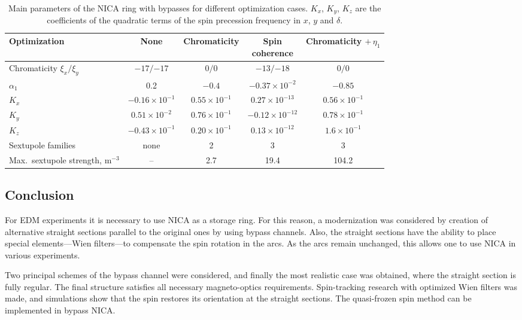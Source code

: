 \documentclass[%
  aps,
  pra,
  preprint,
  a4paper,
  amsmath,
  amssymb,
  floatfix,
  longbibliography,
  superscriptaddress
]{revtex4-2}
\begin{document}
\begin{table}[htbp]
  \centering
  \caption{Main parameters of the NICA ring with bypasses for different
    optimization cases. $K_x$, $K_y$, $K_z$ are the coefficients of the
    quadratic terms of the spin precession frequency in $x$, $y$ and $\delta$.}
  \label{tab:bypass_opt}
  \small
  \setlength{\tabcolsep}{3pt}
  \begin{tabular}{lcccc}
    \toprule
    Optimization & None & Chromaticity & \makecell{Spin\\coherence}
      & \makecell{Chromaticity\\$+\,\eta_1$} \\
    \midrule
    Chromaticity $\xi_x/\xi_y$ & $-17/{-17}$ & $0/0$ & $-13/{-18}$ & $0/0$ \\
    $\alpha_1$ & 0.2 & $-0.4$ & $-0.37\times10^{-2}$ & $-0.85$ \\
    $K_x$ & $-0.16\times10^{-1}$ & $0.55\times10^{-1}$ & $0.27\times10^{-13}$ & $0.56\times10^{-1}$ \\
    $K_y$ & $0.51\times10^{-2}$ & $0.76\times10^{-1}$ & $-0.12\times10^{-12}$ & $0.78\times10^{-1}$ \\
    $K_z$ & $-0.43\times10^{-1}$ & $0.20\times10^{-1}$ & $0.13\times10^{-12}$ & $1.6\times10^{-1}$ \\
    Sextupole families & none & 2 & 3 & 3 \\
    \makecell[l]{Max.\ sextupole\\strength, m$^{-3}$} & -- & 2.7 & 19.4 & 104.2 \\
    \bottomrule
  \end{tabular}
\end{table}

\subsection{Conclusion}

For EDM experiments it is necessary to use NICA as a storage ring. For this
reason, a modernization was considered by creation of alternative straight
sections parallel to the original ones by using bypass channels. Also, the
straight sections have the ability to place special elements---Wien
filters---to compensate the spin rotation in the arcs. As the arcs remain
unchanged, this allows one to use NICA in various experiments.

Two principal schemes of the bypass channel were considered, and finally the
most realistic case was obtained, where the straight section is fully regular.
The final structure satisfies all necessary magneto-optics requirements.
Spin-tracking research with optimized Wien filters was made, and simulations
show that the spin restores its orientation at the straight sections. The
quasi-frozen spin method can be implemented in bypass NICA.
\end{document}
